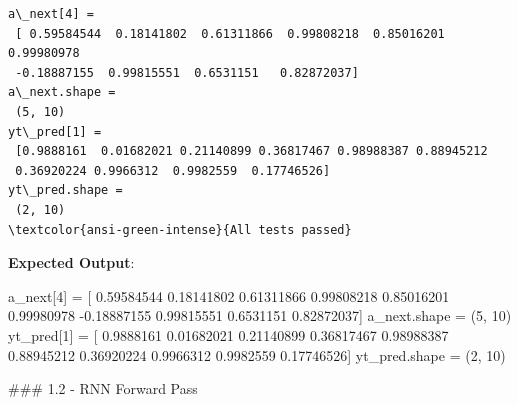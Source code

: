 \documentclass[11pt]{article}
\newenvironment{Shaded}{}{}
\newcommand{\DecValTok}[1]{\textcolor[rgb]{0.25,0.63,0.44}{{#1}}}
\newcommand{\FloatTok}[1]{\textcolor[rgb]{0.25,0.63,0.44}{{#1}}}
\newcommand{\NormalTok}[1]{{#1}}
\newcommand{\OperatorTok}[1]{\textcolor[rgb]{0.40,0.40,0.40}{{#1}}}
\begin{document}
    \begin{Verbatim}[commandchars=\\\{\}]
a\_next[4] =
 [ 0.59584544  0.18141802  0.61311866  0.99808218  0.85016201  0.99980978
 -0.18887155  0.99815551  0.6531151   0.82872037]
a\_next.shape =
 (5, 10)
yt\_pred[1] =
 [0.9888161  0.01682021 0.21140899 0.36817467 0.98988387 0.88945212
 0.36920224 0.9966312  0.9982559  0.17746526]
yt\_pred.shape =
 (2, 10)
\textcolor{ansi-green-intense}{All tests passed}
    \end{Verbatim}

    \textbf{Expected Output}:

\begin{Shaded}
\begin{Highlighting}[]
\NormalTok{a\_next[}\DecValTok{4}\NormalTok{] }\OperatorTok{=} 
\NormalTok{ [ }\FloatTok{0.59584544}  \FloatTok{0.18141802}  \FloatTok{0.61311866}  \FloatTok{0.99808218}  \FloatTok{0.85016201}  \FloatTok{0.99980978}
 \OperatorTok{{-}}\FloatTok{0.18887155}  \FloatTok{0.99815551}  \FloatTok{0.6531151}   \FloatTok{0.82872037}\NormalTok{]}
\NormalTok{a\_next.shape }\OperatorTok{=} 
\NormalTok{ (}\DecValTok{5}\NormalTok{, }\DecValTok{10}\NormalTok{)}
\NormalTok{yt\_pred[}\DecValTok{1}\NormalTok{] }\OperatorTok{=}
\NormalTok{ [ }\FloatTok{0.9888161}   \FloatTok{0.01682021}  \FloatTok{0.21140899}  \FloatTok{0.36817467}  \FloatTok{0.98988387}  \FloatTok{0.88945212}
  \FloatTok{0.36920224}  \FloatTok{0.9966312}   \FloatTok{0.9982559}   \FloatTok{0.17746526}\NormalTok{]}
\NormalTok{yt\_pred.shape }\OperatorTok{=} 
\NormalTok{ (}\DecValTok{2}\NormalTok{, }\DecValTok{10}\NormalTok{)}
\end{Highlighting}
\end{Shaded}

    \#\#\# 1.2 - RNN Forward Pass
\end{document}
